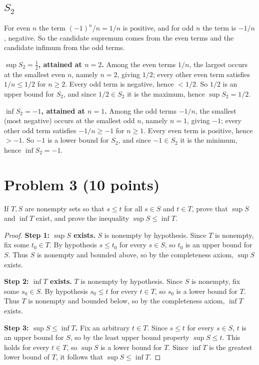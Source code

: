 \documentclass[11pt]{article}
\begin{document}
\subsection*{$S_2$}
For even $n$ the term $(-1)^n/n = 1/n$ is positive, and for odd $n$ the term is $-1/n$, negative. So the candidate supremum comes from the even terms and the candidate infimum from the odd terms.

\textbf{$\sup S_2 = \tfrac12$, attained at $n=2$.} Among the even terms $1/n$, the largest occurs at the smallest even $n$, namely $n=2$, giving $1/2$; every other even term satisfies $1/n \le 1/2$ for $n \ge 2$. Every odd term is negative, hence $< 1/2$. So $1/2$ is an upper bound for $S_2$, and since $1/2 \in S_2$ it is the maximum, hence $\sup S_2 = 1/2$.

\textbf{$\inf S_2 = -1$, attained at $n=1$.} Among the odd terms $-1/n$, the smallest (most negative) occurs at the smallest odd $n$, namely $n=1$, giving $-1$; every other odd term satisfies $-1/n \ge -1$ for $n\ge 1$. Every even term is positive, hence $> -1$. So $-1$ is a lower bound for $S_2$, and since $-1\in S_2$ it is the minimum, hence $\inf S_2 = -1$.

\section*{Problem 3 (10 points)}
If $T,S$ are nonempty sets so that $s \le t$ for all $s\in S$ and $t\in T$,
prove that $\sup S$ and $\inf T$ exist, and prove the inequality
$\sup S \le \inf T$.

\begin{proof}
\textbf{Step 1: $\sup S$ exists.} $S$ is nonempty by hypothesis. Since $T$ is nonempty, fix some $t_0 \in T$. By hypothesis $s \le t_0$ for every $s \in S$, so $t_0$ is an upper bound for $S$. Thus $S$ is nonempty and bounded above, so by the completeness axiom, $\sup S$ exists.

\textbf{Step 2: $\inf T$ exists.} $T$ is nonempty by hypothesis. Since $S$ is nonempty, fix some $s_0 \in S$. By hypothesis $s_0 \le t$ for every $t \in T$, so $s_0$ is a lower bound for $T$. Thus $T$ is nonempty and bounded below, so by the completeness axiom, $\inf T$ exists.

\textbf{Step 3: $\sup S \le \inf T$.} Fix an arbitrary $t \in T$. Since $s \le t$ for every $s \in S$, $t$ is an upper bound for $S$, so by the least upper bound property $\sup S \le t$. This holds for every $t \in T$, so $\sup S$ is a lower bound for $T$. Since $\inf T$ is the greatest lower bound of $T$, it follows that $\sup S \le \inf T$.

\end{proof}
\end{document}
